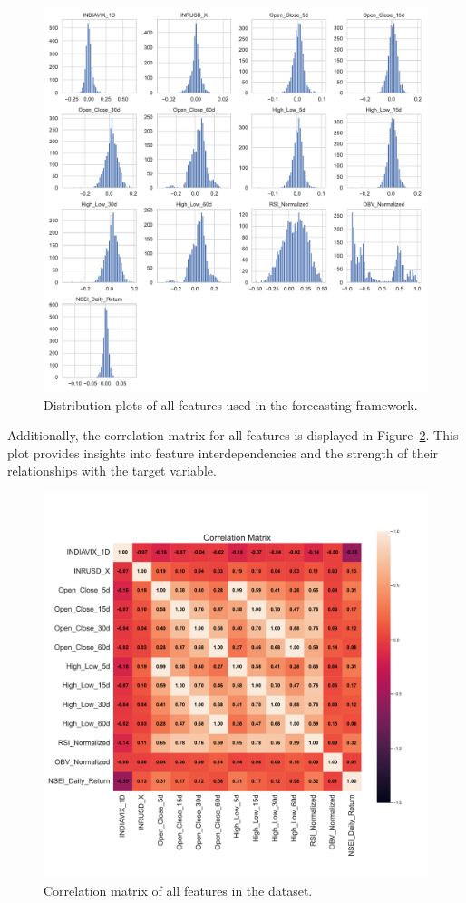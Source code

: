 \begin{figure}[h!]
    \centering
    \includegraphics[width=\textwidth]{Images/feature_distributions.pdf}
    \caption{Distribution plots of all features used in the forecasting framework.}
    \label{fig:feature_distributions}
\end{figure}

Additionally, the correlation matrix for all features is displayed in Figure~\ref{fig:correlation_plot}. This plot provides insights into feature interdependencies and the strength of their relationships with the target variable.

\begin{figure}[h!]
    \centering
    \includegraphics[width=\textwidth]{Images/correlation_plot.pdf}
    \caption{Correlation matrix of all features in the dataset.}
    \label{fig:correlation_plot}
\end{figure}

